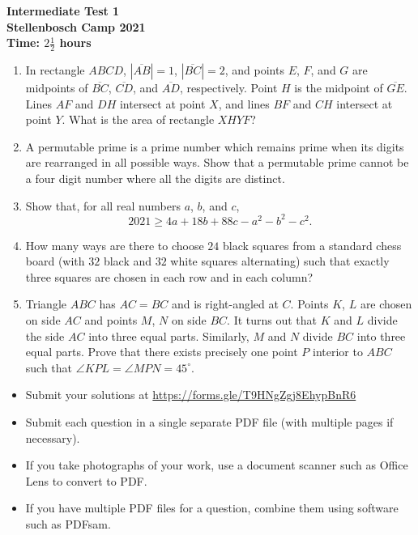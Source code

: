 \documentclass{article}
\begin{document}
\thispagestyle{empty}

\begin{center}
  \textbf{\Large Intermediate Test 1}
  \\ \vspace{1em}
  \textbf{\large Stellenbosch Camp 2021}
  \\ \vspace{1em}
  \textbf{\large Time: $2\frac{1}{2}$ hours}
\end{center}

\vspace{24pt}

\begin{enumerate}[1.]

\item %
In rectangle $ABCD$, $|\overline{AB}|=1$, $|\overline{BC}|=2$, and points $E$, $F$, and $G$ are midpoints of $\overline{BC}$, $\overline{CD}$, and $\overline{AD}$, respectively.
Point $H$ is the midpoint of $\overline{GE}$.
Lines $AF$ and $DH$ intersect at point $X$, and lines $BF$ and $CH$ intersect at point $Y$.
What is the area of rectangle $XHYF$?


\item %
A permutable prime is a prime number which remains prime when its digits are rearranged in all possible ways. Show that a permutable prime cannot be a four digit number where all the digits are distinct.

\item %
Show that, for all real numbers $a$, $b$, and $c$,
\[ 2021 \geq 4a + 18b + 88c - a^2 - b^2 - c^2. \]


\item %
How many ways are there to choose $24$ black squares from a standard chess board (with $32$ black and $32$ white squares alternating) such that exactly three squares are chosen in each row and in each column?


\item %
Triangle $ABC$ has $AC=BC$ and is right-angled at $C$. Points $K$, $L$ are chosen on side $AC$ and points $M$, $N$ on side $BC$. It turns out that $K$ and $L$ divide the side $AC$ into three equal parts. Similarly, $M$ and $N$ divide $BC$ into three equal parts. Prove that there exists precisely one point $P$ interior to $ABC$ such that $\angle KPL = \angle MPN = 45^{\circ}$.
\end{enumerate}


\vfill
\begin{itemize}
	\item Submit your solutions at \href{https://forms.gle/T9HNgZgj8EhypBnR6}{https://forms.gle/T9HNgZgj8EhypBnR6}
	\item Submit each question in a single separate PDF file (with multiple pages if necessary).
	\item If you take photographs of your work, use a document scanner such as Office Lens to convert to PDF.
	\item If you have multiple PDF files for a question, combine them using software such as PDFsam.
\end{itemize}
\end{document}
